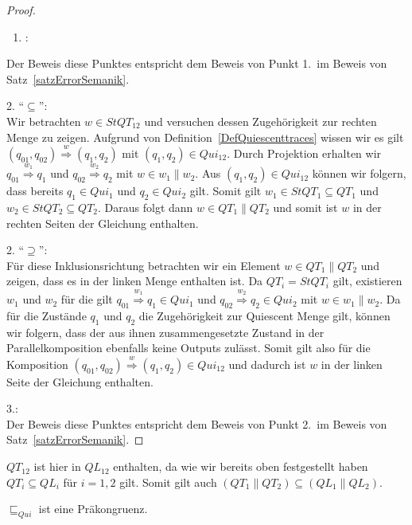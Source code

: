 \begin{proof}
  ~
  \begin{enumerate}
    \item \hspace{-0.2cm}:
  \end{enumerate}
  \vspace{-0.3cm}
  Der Beweis diese Punktes entspricht dem Beweis von Punkt 1.\ im Beweis von
  Satz~\ref{satzErrorSemanik}.

  2. ``$\subseteq$'':\\
  Wir betrachten $w\in StQT_{12}$ und versuchen dessen
  Zugehörigkeit zur rechten Menge zu zeigen. Aufgrund von
  Definition~\ref{DefQuiescenttraces} wissen wir es gilt $(q_{01},q_{02})
  \overset{w}{\Rightarrow} (q_1,q_2)$ mit $(q_1,q_2)\in Qui_{12}$. Durch
  Projektion erhalten wir $q_{01} \overset{w_1}{\Rightarrow} q_1$ und $q_{02}
  \overset{w_2}{\Rightarrow} q_2$ mit $w\in w_1\|w_2$. Aus $(q_1,q_2)\in
  Qui_{12}$ können wir folgern, dass bereits $q_1\in Qui_1$ und $q_2\in
  Qui_2$ gilt. Somit gilt $w_1\in StQT_1\subseteq QT_1$ und $w_2\in
  StQT_2\subseteq QT_2$. Daraus folgt dann $w\in QT_1\|QT_2$ und somit ist $w$
  in der rechten Seiten der Gleichung enthalten.

  2. ``$\supseteq$'':\\
  Für diese Inklusionsrichtung betrachten wir ein Element $w\in QT_1\|QT_2$ und
  zeigen, dass es in der linken Menge enthalten ist. Da $QT_i = StQT_i$ gilt,
  existieren $w_1$ und $w_2$ für die gilt $q_{01} \overset{w_1}{\Rightarrow}
  q_1\in Qui_1$ und $q_{02} \overset{w_2}{\Rightarrow} q_2\in Qui_2$ mit $w\in
  w_1\| w_2$. Da für die Zustände $q_1$ und $q_2$ die Zugehörigkeit zur
  Quiescent Menge gilt, können wir folgern, dass der aus ihnen zusammengesetzte
  Zustand in der Parallelkomposition ebenfalls keine Outputs zulässt. Somit
  gilt also für die Komposition $(q_{01},q_{02}) \overset{w}{\Rightarrow}
  (q_1,q_2)\in Qui_{12}$ und dadurch ist $w$ in der linken Seite der Gleichung
  enthalten.

  3.:\\
  Der Beweis diese Punktes entspricht dem Beweis von Punkt 2.\ im Beweis von
  Satz~\ref{satzErrorSemanik}.
\end{proof}

$QT_{12}$ ist hier in $QL_{12}$ enthalten, da wie wir bereits oben festgestellt
haben $QT_i\subseteq QL_i$ für $i=1,2$ gilt. Somit gilt auch
$(QT_1\|QT_2)\subseteq (QL_1\|QL_2)$.

\begin{prop}[Präkongruenz]
  $\sqsubseteq _{Qui}$ ist eine Präkongruenz.
\end{prop}

